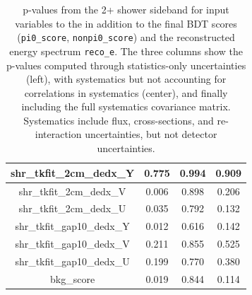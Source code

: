 \begin{table}[H]
\begin{tabular}{| c | c | c | c | }
shr\_tkfit\_2cm\_dedx\_Y & 0.775 & 0.994 & 0.909 \\ \hline
shr\_tkfit\_2cm\_dedx\_V & 0.006 & 0.898 & 0.206 \\ \hline
shr\_tkfit\_2cm\_dedx\_U & 0.035 & 0.792 & 0.132 \\ \hline
shr\_tkfit\_gap10\_dedx\_Y & 0.012 & 0.616 & 0.142 \\ \hline
shr\_tkfit\_gap10\_dedx\_V & 0.211 & 0.855 & 0.525 \\ \hline
shr\_tkfit\_gap10\_dedx\_U & 0.199 & 0.770 & 0.380 \\ \hline
bkg\_score & 0.019 & 0.844 & 0.114 \\ \hline
 \end{tabular}
 \caption{\label{tab:1e0p:twopshr:pvalues}p-values from the 2+ shower \zpsel sideband for input variables to the \zpsel in addition to the final BDT scores (\texttt{pi0\_score}, \texttt{nonpi0\_score}) and the reconstructed energy spectrum \texttt{reco\_e}. The three columns show the p-values computed through statistics-only uncertainties (left), with systematics but not accounting for correlations in systematics (center), and finally including the full systematics covariance matrix. Systematics include flux, cross-sections, and re-interaction uncertainties, but not detector uncertainties.}
\end{table}



